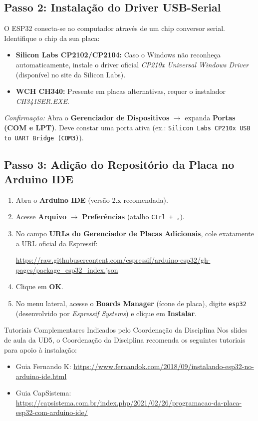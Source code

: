 \documentclass[a4paper,11pt]{article}
\begin{document}
\subsection{Passo 2: Instalação do Driver USB-Serial}
O ESP32 conecta-se ao computador através de um chip conversor serial. Identifique o chip da sua placa:
\begin{itemize}
    \item \textbf{Silicon Labs CP2102/CP2104:} Caso o Windows não reconheça automaticamente, instale o driver oficial \textit{CP210x Universal Windows Driver} (disponível no site da Silicon Labs).
    \item \textbf{WCH CH340:} Presente em placas alternativas, requer o instalador \textit{CH341SER.EXE}.
\end{itemize}
\textit{Confirmação:} Abra o \textbf{Gerenciador de Dispositivos} $\rightarrow$ expanda \textbf{Portas (COM e LPT)}. Deve constar uma porta ativa (ex.: \texttt{Silicon Labs CP210x USB to UART Bridge (COM3)}).

\subsection{Passo 3: Adição do Repositório da Placa no Arduino IDE}
\begin{enumerate}
    \item Abra o \textbf{Arduino IDE} (versão 2.x recomendada).
    \item Acesse \textbf{Arquivo} $\rightarrow$ \textbf{Preferências} (atalho \texttt{Ctrl + ,}).
    \item No campo \textbf{URLs do Gerenciador de Placas Adicionais}, cole exatamente a URL oficial da Espressif:
    \begin{tcolorbox}[colback=codebg,colframe=darkslate,boxrule=0.8pt,top=1.5mm,bottom=1.5mm]
    \footnotesize\color{keywordblue}\url{https://raw.githubusercontent.com/espressif/arduino-esp32/gh-pages/package_esp32_index.json}
    \end{tcolorbox}
    \item Clique em \textbf{OK}.
    \item No menu lateral, acesse o \textbf{Boards Manager} (ícone de placa), digite \texttt{esp32} (desenvolvido por \textit{Espressif Systems}) e clique em \textbf{Instalar}.
\end{enumerate}

\begin{infobox}{Tutoriais Complementares Indicados pelo Coordenação da Disciplina}
Nos slides de aula da UD5, o Coordenação da Disciplina recomenda os seguintes tutoriais para apoio à instalação:
\begin{itemize}[leftmargin=*]
    \item Guia Fernando K: \url{https://www.fernandok.com/2018/09/instalando-esp32-no-arduino-ide.html}
    \item Guia CapSistema: \url{https://capsistema.com.br/index.php/2021/02/26/programacao-da-placa-esp32-com-arduino-ide/}
\end{itemize}
\end{infobox}
\end{document}
